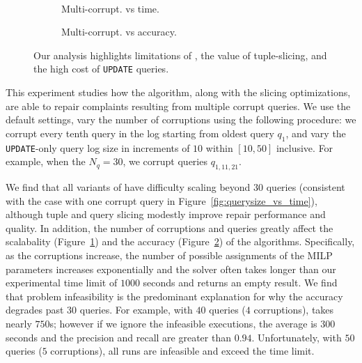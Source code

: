 \begin{figure}[t]
\begin{minipage}{.49\textwidth}
\begin{subfigure}[t]{.99\textwidth}
      \vspace*{-.1in}
    \end{subfigure} \\
    \begin{subfigure}[t]{.39\textwidth}
      \vspace*{-.1in}
      \caption{Multi-corrupt. vs time.}
      \label{f:multi_time} 
    \end{subfigure}
    \begin{subfigure}[t]{.59\textwidth}
      \vspace*{-.1in}
      \caption{Multi-corrupt. vs accuracy.}
      \label{f:multi_acc} 
    \end{subfigure}
    \vspace*{-.1in}
    \caption{Our analysis highlights limitations of \naive, the value of tuple-slicing, and the high cost of \texttt{UPDATE} queries. }
     \label{f:multi} 
  \end{minipage}
  \end{figure}



 
This experiment studies how the \naive algorithm, along with the slicing optimizations, are able to repair complaints resulting from multiple corrupt queries.
We use the default settings, vary the number of corruptions using the following procedure:
we  corrupt every tenth query in the log starting from oldest query $q_1$, and vary the \texttt{UPDATE}-only query log size  in increments of $10$ within $[10, 50]$ inclusive.
For example, when the $N_q = {30}$, we corrupt queries $q_{1,11,21}$. 

We find that all variants of \naive have difficulty scaling beyond $30$ queries (consistent with the case with one corrupt query in Figure~\ref{fig:querysize_vs_time}), although tuple and query slicing modestly improve repair performance and quality.
In addition, the number of corruptions and queries greatly affect the scalabality (Figure~\ref{f:multi_time}) and the accuracy (Figure~\ref{f:multi_acc}) of the algorithms. 
Specifically, as the corruptions increase, the number of possible assignments of the MILP parameters increases exponentially and the solver often takes longer than our experimental time limit of $1000$ seconds and returns an empty result.
We find that problem infeasibility is the predominant explanation for why the accuracy degrades past $30$ queries.  
For example, with $40$ queries ($4$ corruptions), \naive takes nearly $750$s; however if we ignore the infeasible executions, the average is $300$ seconds and the precision and recall are greater than $0.94$.  
Unfortunately, with $50$ queries ($5$ corruptions), all runs are infeasible and exceed the time limit.



